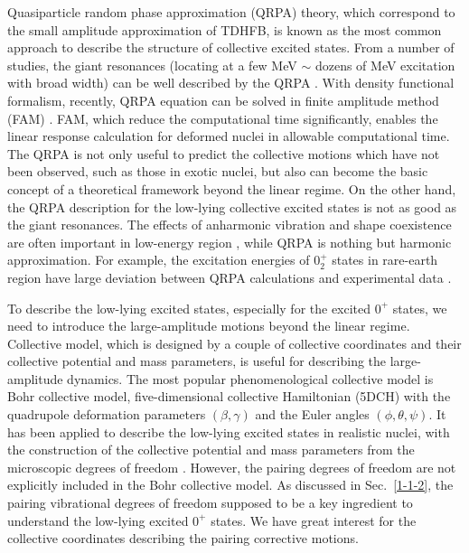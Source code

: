 \documentclass[11pt]{book} %
\begin{document}
Quasiparticle random phase approximation (QRPA) theory, which correspond to the small amplitude approximation of TDHFB, is known as the most common approach to describe the structure of collective excited states. From a number of studies, the giant resonances (locating at a few MeV $\sim$ dozens of MeV excitation with broad width) can be well described by the QRPA \cite{Eba10, YN11, YN13, SL13-2}. With density functional formalism, recently, QRPA equation can be solved in finite amplitude method (FAM) \cite{Na07}. FAM, which reduce the computational time significantly, enables the linear response calculation for deformed nuclei in allowable computational time. 
The QRPA is not only useful to predict the collective motions which have not been observed, such as those in exotic nuclei, but also can become the basic concept of a theoretical framework beyond the linear regime. On the other hand, the QRPA description for the low-lying collective excited states is not as good as the giant resonances. The effects of anharmonic vibration and shape coexistence are often important in low-energy region \cite{HW11}, while QRPA is nothing but harmonic approximation. For example, the excitation energies of $0_2^+$ states in rare-earth region have large deviation between QRPA calculations and experimental data \cite{TE11}. 

To describe the low-lying excited states, especially for the excited $0^+$ states, we need to introduce the large-amplitude motions beyond the linear regime.
Collective model, which is designed by a couple of collective coordinates and their collective potential and mass parameters, is useful for describing the large-amplitude dynamics. The most popular phenomenological collective model is Bohr collective model, five-dimensional collective Hamiltonian (5DCH) with the quadrupole deformation parameters $(\beta,\gamma)$ and the Euler angles $(\phi,\theta,\psi)$. It has been applied to describe the low-lying excited states in realistic nuclei, with the construction of the collective potential and mass parameters from the microscopic degrees of freedom \cite{NMMY16}. However, the pairing degrees of freedom are not explicitly included in the Bohr collective model. As discussed in Sec.~\ref{1-1-2}, the pairing vibrational degrees of freedom supposed to be a key ingredient to understand the low-lying  excited $0^+$ states. We have great interest for the collective coordinates describing the pairing corrective motions.
\end{document}
